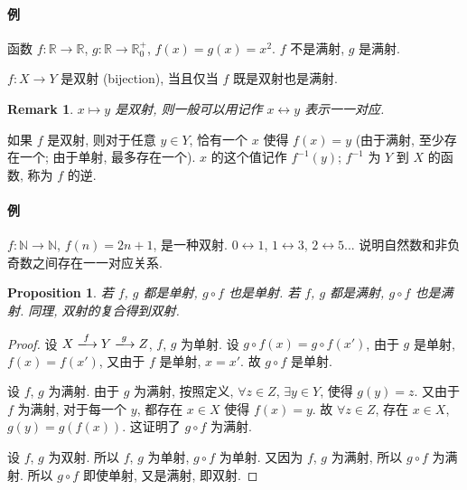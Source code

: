 \documentclass[UTF8]{ctexart}
\theoremstyle{mystyle}
\newtheorem{proposition}{Proposition}[section]
\theoremstyle{myremark}
\newtheorem*{remark}{Remark}
\theoremstyle{plain}
\newcommand{\R}{\mathbb R}
\newcommand{\N}{\mathbb N}
\begin{document}
\paragraph{例}
函数 $ f \colon \R \to \R $, $ g: \R \to \R_0^+ $, $ f(x) = g(x) = x^2 $. $ f $ 不是满射, $ g $ 是满射.


\begin{definition}
    $ f \colon X \to Y $ 是双射 (bijection), 当且仅当 $ f $ 既是双射也是满射.
\end{definition}

\begin{remark}
    $ x \mapsto y $ 是双射, 则一般可以用记作 $ x \leftrightarrow y $ 表示一一对应.
\end{remark}

如果 $ f $ 是双射, 则对于任意 $ y \in Y $, 恰有一个 $ x $ 使得 $ f(x) = y $ (由于满射, 至少存在一个; 由于单射, 最多存在一个). $ x $ 的这个值记作 $ f^{-1}(y) $; $ f^{-1} $ 为 $ Y $ 到 $ X $ 的函数, 称为 $ f $ 的逆.

\paragraph{例}
$ f \colon \N \to \N $, $ f(n) = 2 n + 1 $, 是一种双射. $ 0 \leftrightarrow 1 $, $ 1 \leftrightarrow 3 $, $ 2 \leftrightarrow 5 $... 说明自然数和非负奇数之间存在一一对应关系.

\begin{proposition} \label{c}
    若 $ f $, $ g $ 都是单射, $ g \circ f $ 也是单射. 若 $ f $, $ g $ 都是满射, $ g \circ f $ 也是满射. 同理, 双射的复合得到双射.
\end{proposition}

\begin{proof}
    设 $ X \xlongrightarrow{f} Y \xlongrightarrow{g} Z $, $ f $, $ g $ 为单射. 设 $ g \circ f (x) = g \circ f (x') $, 由于 $ g $ 是单射, $ f(x) = f(x') $, 又由于 $ f $ 是单射, $ x = x' $. 故 $ g \circ f $ 是单射.

    设 $ f $, $ g $ 为满射. 由于 $ g $ 为满射, 按照定义, $ \forall z \in Z $, $ \exists y \in Y $, 使得 $ g (y) = z $. 又由于 $ f $ 为满射, 对于每一个 $ y $, 都存在 $ x \in X $ 使得 $ f(x) = y $. 故 $ \forall z \in Z $, 存在 $ x \in X $, $ g(y) = g(f(x)) $. 这证明了 $ g \circ f $ 为满射.

    设 $ f $, $ g $ 为双射. 所以 $ f $, $ g $ 为单射, $ g \circ f $ 为单射. 又因为 $ f $, $ g $ 为满射, 所以 $ g \circ f $ 为满射. 所以 $ g \circ f $ 即使单射, 又是满射, 即双射.
\end{proof}
\end{document}
